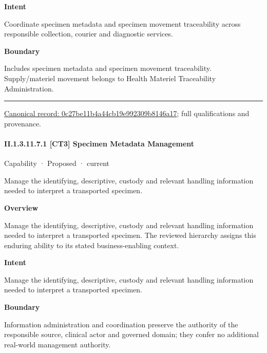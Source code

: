 \textbf{Intent}



Coordinate specimen metadata and specimen movement traceability across responsible collection, courier and diagnostic services.



\textbf{Boundary}



Includes specimen metadata and specimen movement traceability. Supply/materiel movement belongs to Health Materiel Traceability Administration.



\medskip\hrule\medskip

{\footnotesize \href{../../../../continuum/strategy/capability/0c27be11b4a44cb19e992309b8146a17.md}{Canonical record: 0c27be11b4a44cb19e992309b8146a17}; full qualifications and provenance.}\par
\paragraph*{II.1.3.11.7.1 [CT3] Specimen Metadata Management}
\label{navigation:II.1.3.11.7.1}

\label{element:738736425b7446fdae47b06c91c4f69c}
{\small Capability · Proposed · current}\par

Manage the identifying, descriptive, custody and relevant handling information needed to interpret a transported specimen.



\textbf{Overview}



Manage the identifying, descriptive, custody and relevant handling information needed to interpret a transported specimen. The reviewed hierarchy assigns this enduring ability to its stated business-enabling context.



\textbf{Intent}



Manage the identifying, descriptive, custody and relevant handling information needed to interpret a transported specimen.



\textbf{Boundary}



Information administration and coordination preserve the authority of the responsible source, clinical actor and governed domain; they confer no additional real-world management authority.


